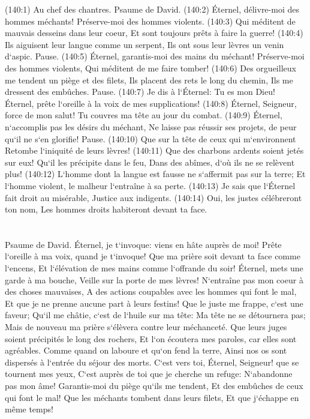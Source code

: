 \verse (140:1) Au chef des chantres. Psaume de David. (140:2) Éternel, délivre-moi des hommes méchants! Préserve-moi des hommes violents. 
\verse (140:3) Qui méditent de mauvais desseins dans leur coeur, Et sont toujours prêts à faire la guerre! 
\verse (140:4) Ils aiguisent leur langue comme un serpent, Ils ont sous leur lèvres un venin d`aspic. Pause. 
\verse (140:5) Éternel, garantis-moi des mains du méchant! Préserve-moi des hommes violents, Qui méditent de me faire tomber! 
\verse (140:6) Des orgueilleux me tendent un piège et des filets, Ils placent des rets le long du chemin, Ils me dressent des embûches. Pause. 
\verse (140:7) Je dis à l`Éternel: Tu es mon Dieu! Éternel, prête l`oreille à la voix de mes supplications! 
\verse (140:8) Éternel, Seigneur, force de mon salut! Tu couvres ma tête au jour du combat. 
\verse (140:9) Éternel, n`accomplis pas les désirs du méchant, Ne laisse pas réussir ses projets, de peur qu`il ne s`en glorifie! Pause. 
\verse (140:10) Que sur la tête de ceux qui m`environnent Retombe l`iniquité de leurs lèvres! 
\verse (140:11) Que des charbons ardents soient jetés sur eux! Qu`il les précipite dans le feu, Dans des abîmes, d`où ils ne se relèvent plus! 
\verse (140:12) L`homme dont la langue est fausse ne s`affermit pas sur la terre; Et l`homme violent, le malheur l`entraîne à sa perte. 
\verse (140:13) Je sais que l`Éternel fait droit au misérable, Justice aux indigents. 
\verse (140:14) Oui, les justes célébreront ton nom, Les hommes droits habiteront devant ta face. 

\chapter{}

\verse Psaume de David. Éternel, je t`invoque: viens en hâte auprès de moi! Prête l`oreille à ma voix, quand je t`invoque! 
\verse Que ma prière soit devant ta face comme l`encens, Et l`élévation de mes mains comme l`offrande du soir! 
\verse Éternel, mets une garde à ma bouche, Veille sur la porte de mes lèvres! 
\verse N`entraîne pas mon coeur à des choses mauvaises, A des actions coupables avec les hommes qui font le mal, Et que je ne prenne aucune part à leurs festins! 
\verse Que le juste me frappe, c`est une faveur; Qu`il me châtie, c`est de l`huile sur ma tête: Ma tête ne se détournera pas; Mais de nouveau ma prière s`élèvera contre leur méchanceté. 
\verse Que leurs juges soient précipités le long des rochers, Et l`on écoutera mes paroles, car elles sont agréables. 
\verse Comme quand on laboure et qu`on fend la terre, Ainsi nos os sont dispersés à l`entrée du séjour des morts. 
\verse C`est vers toi, Éternel, Seigneur! que se tournent mes yeux, C`est auprès de toi que je cherche un refuge: N`abandonne pas mon âme! 
\verse Garantis-moi du piège qu`ils me tendent, Et des embûches de ceux qui font le mal! 
\verse Que les méchants tombent dans leurs filets, Et que j`échappe en même temps! 

